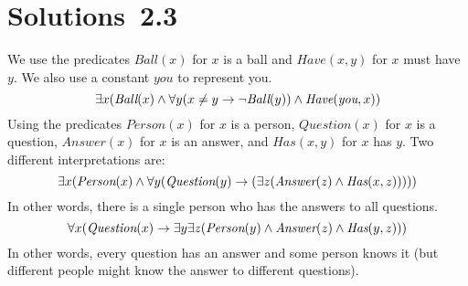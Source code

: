 \section*{Solutions~2.3}%

\begin{solutions}
	\solution
\setcounter{solutioncounter}{7}
\solution We use the predicates $\textit{Ball}(x)$ for $x$ is a ball and $\textit{Have}(x,y)$ for $x$ must have $y$. We also use a constant $\textit{you}$ to represent you.
\[
	\exists x (\textit{Ball}(x) \wedge \forall y (x \neq y \rightarrow \lnot \textit{Ball}(y)) \wedge \textit{Have}(\textit{you}, x))
\]
\setcounter{solutioncounter}{12}
\solution Using the predicates $\textit{Person}(x)$ for $x$ is a person, $\textit{Question}(x)$ for $x$ is a question, $\textit{Answer}(x)$ for $x$ is an answer, and $\textit{Has}(x,y)$ for $x$ has $y$.
Two different interpretations are:
\[
	\exists x (\textit{Person}(x) \wedge \forall y (\textit{Question}(y) \rightarrow (\exists z (\textit{Answer}(z) \wedge \textit{Has}(x,z)))))
\]
In other words, there is a single person who has the answers to all questions. 
\[
	\forall x (\textit{Question}(x) \rightarrow \exists y \exists z (\textit{Person}(y) \wedge \textit{Answer}(z) \wedge \textit{Has}(y,z)))
\]
In other words, every question has an answer and some person knows it (but different people might know the answer to different questions).
\end{solutions}
